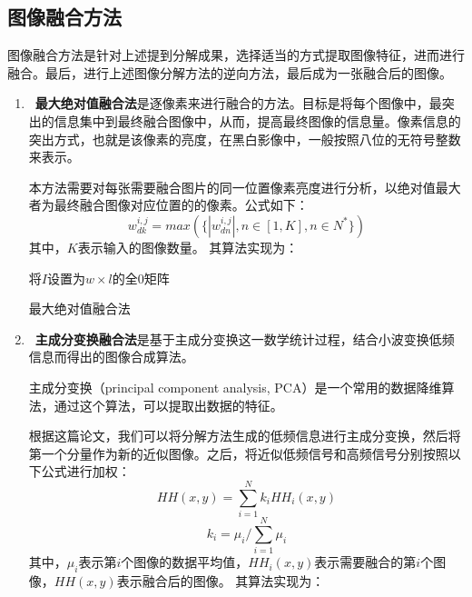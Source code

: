 \documentclass{xduugthesis}
\begin{document}
\subsection{图像融合方法}
图像融合方法是针对上述提到分解成果，选择适当的方式提取图像特征，进而进行融合。最后，进行上述图像分解方法的逆向方法，最后成为一张融合后的图像。\par
\begin{enumerate}
\item \textbf{最大绝对值融合法}是逐像素来进行融合的方法。目标是将每个图像中，最突出的信息集中到最终融合图像中，从而，提高最终图像的信息量。像素信息的突出方式，也就是该像素的亮度，在黑白影像中，一般按照八位的无符号整数来表示。\par
本方法需要对每张需要融合图片的同一位置像素亮度进行分析，以绝对值最大者为最终融合图像对应位置的的像素。公式如下：
$$w_{dk}^{i,j}=max\left(\{\left|w_{dn}^{i,j}\right|,n\in\left[1,K\right],n\in N^\ast\}\right)$$
其中，$K$表示输入的图像数量。
其算法实现为：\par
\IncMargin{1em}
\begin{algorithm}
	将$I$设置为$w\times l$的全0矩阵\;
	\caption{最大绝对值融合法}
\end{algorithm}
\DecMargin{1em}
\item \textbf{主成分变换融合法}是基于主成分变换这一数学统计过程，结合小波变换低频信息而得出的图像合成算法。\par
主成分变换（principal component analysis, PCA）是一个常用的数据降维算法，通过这个算法，可以提取出数据的特征。\par
根据这篇论文\cite{PCA_Merge}，我们可以将分解方法生成的低频信息进行主成分变换，然后将第一个分量作为新的近似图像。之后，将近似低频信号和高频信号分别按照以下公式进行加权：
$$HH(x,y)=\sum_{i=1}^{N}k_iHH_i(x,y)$$
$$k_i=\mu_i/\sum_{i=1}^{N}\mu_i$$
其中，$\mu_i$表示第$i$个图像的数据平均值，$HH_i(x,y)$表示需要融合的第$i$个图像，$HH(x,y)$表示融合后的图像。
其算法实现为：\par
\IncMargin{1em}
\begin{algorithm}
	

\end{algorithm}
\end{enumerate}
\end{document}
